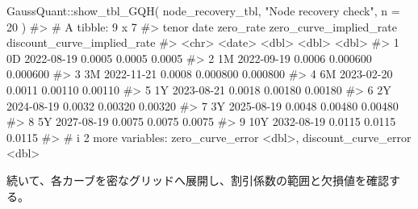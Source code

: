 \documentclass[
  letterpaper,
  DIV=11,
  numbers=noendperiod]{scrreprt}
\newenvironment{Shaded}{\begin{snugshade}}{\end{snugshade}}
\newcommand{\AttributeTok}[1]{\textcolor[rgb]{0.40,0.45,0.13}{#1}}
\newcommand{\CommentTok}[1]{\textcolor[rgb]{0.37,0.37,0.37}{#1}}
\newcommand{\DecValTok}[1]{\textcolor[rgb]{0.68,0.00,0.00}{#1}}
\newcommand{\FunctionTok}[1]{\textcolor[rgb]{0.28,0.35,0.67}{#1}}
\newcommand{\NormalTok}[1]{\textcolor[rgb]{0.00,0.23,0.31}{#1}}
\newcommand{\SpecialCharTok}[1]{\textcolor[rgb]{0.37,0.37,0.37}{#1}}
\newcommand{\StringTok}[1]{\textcolor[rgb]{0.13,0.47,0.30}{#1}}
\begin{document}
\begin{Shaded}
\begin{Highlighting}[]
\NormalTok{GaussQuant}\SpecialCharTok{::}\FunctionTok{show\_tbl\_GQH}\NormalTok{(}
\NormalTok{  node\_recovery\_tbl,}
  \StringTok{"Node recovery check"}\NormalTok{,}
  \AttributeTok{n =} \DecValTok{20}
\NormalTok{)}
\CommentTok{\#\textgreater{} \# A tibble: 9 x 7}
\CommentTok{\#\textgreater{}   tenor date       zero\_rate zero\_curve\_implied\_rate discount\_curve\_implied\_rate}
\CommentTok{\#\textgreater{}   \textless{}chr\textgreater{} \textless{}date\textgreater{}         \textless{}dbl\textgreater{}                   \textless{}dbl\textgreater{}                       \textless{}dbl\textgreater{}}
\CommentTok{\#\textgreater{} 1 0D    2022{-}08{-}19    0.0005                0.0005                      0.0005  }
\CommentTok{\#\textgreater{} 2 1M    2022{-}09{-}19    0.0006                0.000600                    0.000600}
\CommentTok{\#\textgreater{} 3 3M    2022{-}11{-}21    0.0008                0.000800                    0.000800}
\CommentTok{\#\textgreater{} 4 6M    2023{-}02{-}20    0.0011                0.00110                     0.00110 }
\CommentTok{\#\textgreater{} 5 1Y    2023{-}08{-}21    0.0018                0.00180                     0.00180 }
\CommentTok{\#\textgreater{} 6 2Y    2024{-}08{-}19    0.0032                0.00320                     0.00320 }
\CommentTok{\#\textgreater{} 7 3Y    2025{-}08{-}19    0.0048                0.00480                     0.00480 }
\CommentTok{\#\textgreater{} 8 5Y    2027{-}08{-}19    0.0075                0.0075                      0.0075  }
\CommentTok{\#\textgreater{} 9 10Y   2032{-}08{-}19    0.0115                0.0115                      0.0115  }
\CommentTok{\#\textgreater{} \# i 2 more variables: zero\_curve\_error \textless{}dbl\textgreater{}, discount\_curve\_error \textless{}dbl\textgreater{}}
\end{Highlighting}
\end{Shaded}

続いて、各カーブを密なグリッドへ展開し、割引係数の範囲と欠損値を確認する。
\end{document}
